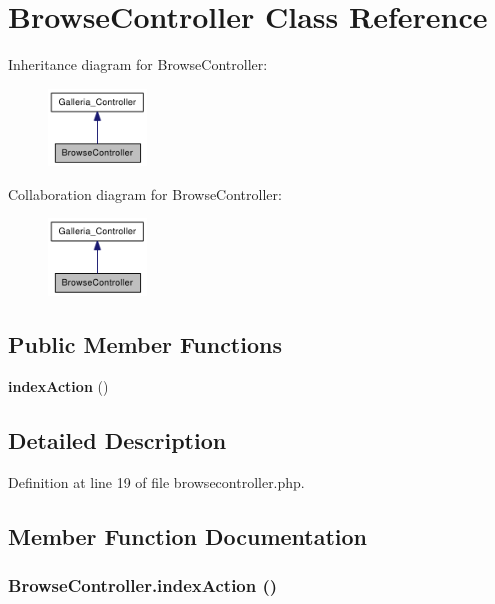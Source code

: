 \section{BrowseController Class Reference}
\label{classBrowseController}
Inheritance diagram for BrowseController:\nopagebreak
\begin{figure}[H]
\begin{center}
\leavevmode
\includegraphics[width=74pt]{classBrowseController__inherit__graph}
\end{center}
\end{figure}
Collaboration diagram for BrowseController:\nopagebreak
\begin{figure}[H]
\begin{center}
\leavevmode
\includegraphics[width=74pt]{classBrowseController__coll__graph}
\end{center}
\end{figure}
\subsection*{Public Member Functions}
\begin{CompactItemize}
\item 
{\bf indexAction} ()
\end{CompactItemize}


\subsection{Detailed Description}


Definition at line 19 of file browsecontroller.php.

\subsection{Member Function Documentation}
\subsubsection{\setlength{\rightskip}{0pt plus 5cm}BrowseController.indexAction ()}\label{classBrowseController_c12a5cf382694a070e902cb5555d9726}



